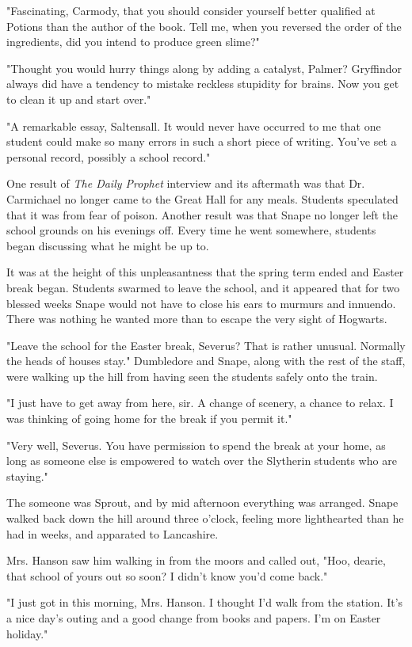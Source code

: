 \documentclass[a4paper,11pt]{article}
\begin{document}
"Fascinating, Carmody, that you should consider yourself better qualified at Potions than the author of the book. Tell me, when you reversed the order of the ingredients, did you intend to produce green slime?"

"Thought you would hurry things along by adding a catalyst, Palmer? Gryffindor always did have a tendency to mistake reckless stupidity for brains. Now you get to clean it up and start over."

"A remarkable essay, Saltensall. It would never have occurred to me that one student could make so many errors in such a short piece of writing. You've set a personal record, possibly a school record."

One result of \emph{The Daily Prophet} interview and its aftermath was that Dr. Carmichael no longer came to the Great Hall for any meals. Students speculated that it was from fear of poison. Another result was that Snape no longer left the school grounds on his evenings off. Every time he went somewhere, students began discussing what he might be up to.

It was at the height of this unpleasantness that the spring term ended and Easter break began. Students swarmed to leave the school, and it appeared that for two blessed weeks Snape would not have to close his ears to murmurs and innuendo. There was nothing he wanted more than to escape the very sight of Hogwarts.

"Leave the school for the Easter break, Severus? That is rather unusual. Normally the heads of houses stay." Dumbledore and Snape, along with the rest of the staff, were walking up the hill from having seen the students safely onto the train.

"I just have to get away from here, sir. A change of scenery, a chance to relax. I was thinking of going home for the break if you permit it."

"Very well, Severus. You have permission to spend the break at your home, as long as someone else is empowered to watch over the Slytherin students who are staying."

The someone was Sprout, and by mid afternoon everything was arranged. Snape walked back down the hill around three o'clock, feeling more lighthearted than he had in weeks, and apparated to Lancashire.

Mrs. Hanson saw him walking in from the moors and called out, "Hoo, dearie, that school of yours out so soon? I didn't know you'd come back."

"I just got in this morning, Mrs. Hanson. I thought I'd walk from the station. It's a nice day's outing and a good change from books and papers. I'm on Easter holiday."
\end{document}
